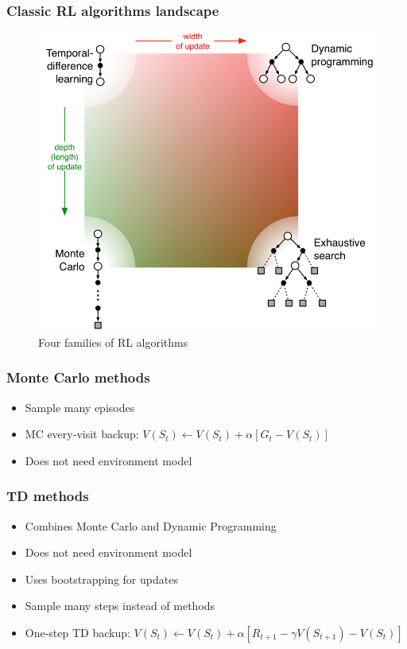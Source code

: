\documentclass{beamer}
\begin{document}
\begin{frame}
  \frametitle{Classic RL algorithms landscape}
  \begin{figure}
    \centering
    \includegraphics[height=0.7 \textheight]{algorithms_landscape}
    \caption{Four families of RL algorithms}
  \end{figure}
\end{frame}

\begin{frame}
  \frametitle{Monte Carlo methods}
  \begin{itemize}
    \item Sample many episodes
    \item MC every-visit backup: $V(S_t) \leftarrow V(S_t) +
      \alpha[G_t - V(S_t)]$
    \item Does not need environment model
  \end{itemize}
\end{frame}

\begin{frame}
  \frametitle{TD methods}
  \begin{itemize}
    \item Combines Monte Carlo and Dynamic Programming
    \item Does not need environment model
    \item Uses bootstrapping for updates
    \item Sample many steps instead of methods
    \item One-step TD backup: $V(S_t) \leftarrow V(S_t) +
      \alpha[R_{t+1} - \gamma V(S_{t+1}) - V(S_t)]$
  \end{itemize}
\end{frame}
\end{document}
